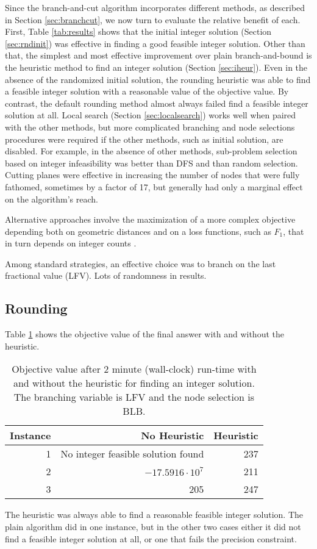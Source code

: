 \documentclass[11pt]{article}
\theoremstyle{definition}
\begin{document}
Since the branch-and-cut algorithm incorporates different methods,
as described in Section \ref{sec:branchcut},
we now turn to evaluate the relative benefit of each.
First, Table \ref{tab:results} shows that the initial integer solution 
(Section \ref{sec:rndinit}) was effective in finding a good feasible integer
solution.
Other than that, 
the simplest and most effective improvement over plain 
branch-and-bound is the heuristic method to find an integer
solution (Section \ref{sec:iheur}).
Even in the absence of the randomized initial solution,
the rounding heuristic was able to find a feasible integer
solution with a reasonable value of the objective value. 
By contrast, the default rounding method almost always failed find a feasible integer solution at all.
Local search (Section \ref{sec:localsearch}) works well when paired with
the other methods, but more complicated branching and node selections
procedures were required if the other methods,
such as initial solution, are disabled. 
For example, in the absence of other methods, 
sub-problem selection based on integer infeasibility was better than DFS and than random selection.
Cutting planes were effective in increasing the
number of nodes that were fully fathomed, 
sometimes by a factor of 17,
but generally had only a marginal effect on the algorithm's reach.

\iffalse
Alternative approaches involve the maximization of a more complex
objective depending both on geometric distances and on a loss functions,
such as $F_1$, that in turn depends on integer counts \cite{svmperf}.



Among standard strategies, an effective choice was to branch on
the last fractional value (LFV). Lots of randomness in results.

\subsection{Rounding}

Table \ref{tab:iheur} shows the objective value of the final answer 
with and without the heuristic.
\begin{table}
\centering
\begin{tabular}{|r|r|r|} \hline
{\bf Instance\/} & {\bf No Heuristic\/}    & {\bf Heuristic\/}  \\ \hline\hline
1 & No integer feasible solution found &   237 \\ \hline
2 & $-17.5916 \cdot 10^7$ & 211 \\ \hline
3 & 205 & 247 \\ \hline
\end{tabular}
\caption{Objective value after 2 minute (wall-clock) run-time
with and without the heuristic for finding an integer solution.
The branching variable is LFV and the node selection is BLB.}
\label{tab:iheur}
\end{table}
The heuristic was always able to find a reasonable feasible integer
solution. The plain algorithm did in one instance, but in the other
two cases either it did not find a feasible integer solution at all,
or one that fails the precision constraint.
\end{document}
